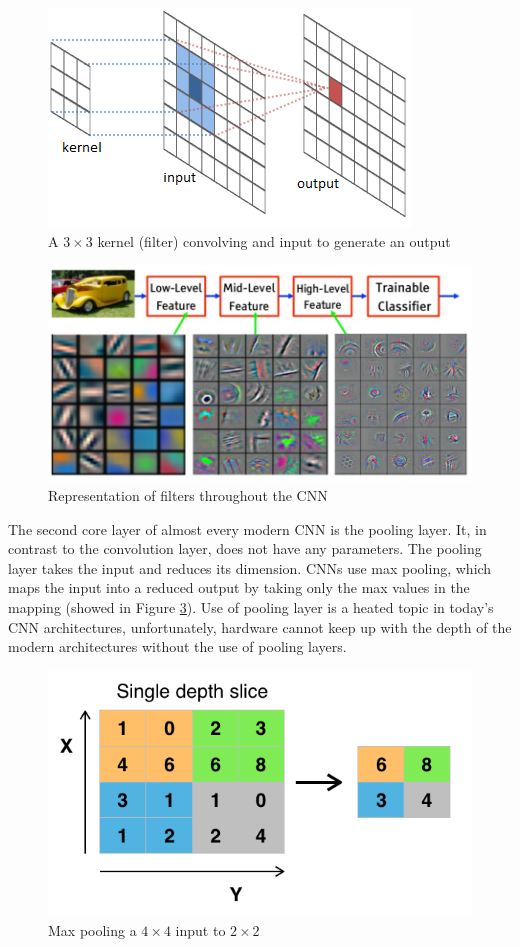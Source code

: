 \documentclass[times, utf8, diplomski]{fer}
\begin{document}
\begin{figure}
  \includegraphics{figures/conv1.png}
  \centering
  \caption{A $3 \times 3$ kernel (filter) convolving and input to generate an output}
  \label{fig:conv1}
\end{figure}

\begin{figure}
  \includegraphics[scale=1.4]{figures/filter.png}
  \centering
  \caption{Representation of filters throughout the CNN}
  \label{fig:filter}
\end{figure}

The second core layer of almost every modern CNN is the pooling layer. It, in contrast to the convolution layer, does not have any parameters. The pooling layer takes the input and reduces its dimension. CNNs use max pooling, which maps the input into a reduced output by taking only the max values in the mapping (showed in Figure \ref{fig:pool}). Use of pooling layer is a heated topic in today's CNN architectures, unfortunately, hardware cannot keep up with the depth of the modern architectures without the use of pooling layers.

\begin{figure}
  \includegraphics[scale=0.6]{figures/pool.png}
  \centering
  \caption{Max pooling a $4\times4$ input to $2\times2$}
  \label{fig:pool}
\end{figure}
\end{document}
